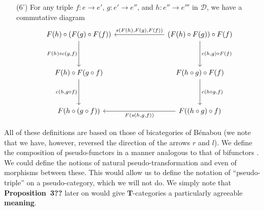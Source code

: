 \documentclass[fleqn]{article}
\newcommand{\oldpage}[1]{\marginpar{\footnotesize$\Big\vert$ \textit{p.~#1}}}
\newcommand{\unsure}[1]{{\color{purple}\textbf{#1}}}
\newcommand{\TT}{\mathbf{T}}
\newcommand{\cat}[1]{\mathcal{#1}}
\begin{document}
\begin{enumerate}
  \item[(6')]
    \oldpage{247}
    For any triple $f\colon e\to e'$, $g\colon e'\to e''$, and $h\colon e''\to e'''$ in $\cat{D}$, we have a commutative diagram
    \[
      \begin{tikzcd}[row sep=huge,column sep=7em]
        F(h)\circ(F(g)\circ F(f))
          \ar[d,swap,"{F(h)\circ c(g,f)}"]
      & (F(h)\circ F(g))\circ F(f)
          \ar[l,swap,"{s(F(h),F(g),F(f))}"]
          \ar[d,"{c(h,g)\circ F(f)}"]
      \\F(h)\circ F(g\circ f)
          \ar[d,swap,"{c(h,g\circ f)}"]
      & F(h\circ g)\circ F(f)
          \ar[d,"{c(h\circ g,f)}"]
      \\F(h\circ(g\circ f))
      & F((h\circ g)\circ f)
          \ar[l,"{F(s(h,g,f))}"]
      \end{tikzcd}
    \]
\end{enumerate}

All of these definitions are based on those of bicategories of Bénabou \cite{Be} (we note that we have, however, reversed the direction of the arrows $r$ and $l$).
We define the composition of pseudo-functors in a manner analogous to that of bifunctors \cite{Be}.
We could define the notions of natural pseudo-transformation and even of morphisms between these.
This would allow us to define the notation of ``pseudo-triple'' on a pseudo-category, which we will not do.
We simply note that \unsure{Proposition~3??} later on would give $\TT$-categories a particularly agreeable \unsure{meaning}.
\end{document}
